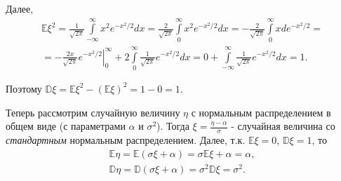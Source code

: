Далее, 
\begin{multline*}
    \mathbb{E} \xi^{2}=\frac{1}{\sqrt{2 \pi}} \int\limits_{-\infty}^{\infty} x^{2} e^{-x^{2} / 2} d x=\frac{2}{\sqrt{2 \pi}} \int\limits_{0}^{\infty} x^{2} e^{-x^{2} / 2} d x=-\frac{2}{\sqrt{2 \pi}} \int\limits_{0}^{\infty} x d e^{-x^{2} / 2}= \\
    =-\left.\frac{2 x}{\sqrt{2 \pi}} e^{-x^{2} / 2}\right|_{0} ^{\infty}+2 \int\limits_{0}^{\infty} \frac{1}{\sqrt{2 \pi}} e^{-x^{2} / 2} d x=0+\int\limits_{-\infty}^{\infty} \frac{1}{\sqrt{2 \pi}} e^{-x^{2} / 2} d x=1.
\end{multline*}

Поэтому $\mathbb{D}\xi = \mathbb{E}\xi^2 - (\mathbb{E}\xi)^2 = 1 - 0 = 1.$

Теперь рассмотрим случайную величину $\eta$ с нормальным распределением в общем виде (с параметрами $\alpha$ и $\sigma^2$). Тогда $\xi = \frac{\eta - \alpha}{\sigma}$ - случайная величина со \textit{стандартным} нормальным распределением. Далее, т.к. $\mathbb{E}\xi = 0$, $\mathbb{D}\xi = 1$, то 
\begin{gather*}
    \mathbb{E}\eta = \mathbb{E}(\sigma \xi + \alpha) = \sigma \mathbb{E} \xi + \alpha = \alpha, \\
    \mathbb{D}\eta = \mathbb{D}(\sigma \xi + \alpha) = \sigma^2 \mathbb{D}\xi = \sigma^2.
\end{gather*}
